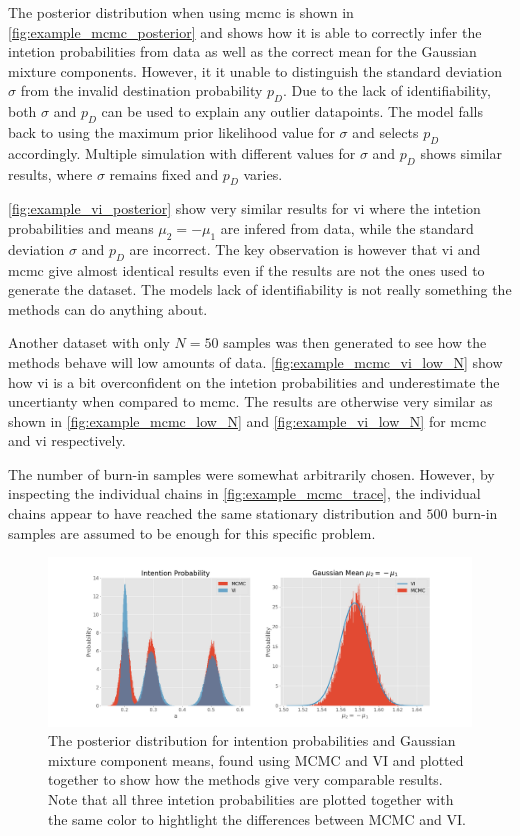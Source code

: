The posterior distribution when using \acrshort{mcmc} is shown in \cref{fig:example_mcmc_posterior} and shows how it is able to correctly infer the intetion probabilities from data as well as the correct mean for the Gaussian mixture components. However, it it unable to distinguish the standard deviation $\sigma$ from the invalid destination probability $p_D$. Due to the lack of identifiability, both $\sigma$ and $p_D$ can be used to explain any outlier datapoints. The model falls back to using the maximum prior likelihood value for $\sigma$ and selects $p_D$ accordingly. Multiple simulation with different values for $\sigma$ and $p_D$ shows similar results, where $\sigma$ remains fixed and $p_D$ varies.

\cref{fig:example_vi_posterior} show very similar results for \acrshort{vi} where the intetion probabilities and means $\mu_2 = -\mu_1$ are infered from data, while the standard deviation $\sigma$ and $p_D$ are incorrect. The key observation is however that \acrshort{vi} and \acrshort{mcmc} give almost identical results even if the results are not the ones used to generate the dataset. The models lack of identifiability is not really something the methods can do anything about.

Another dataset with only $N=50$ samples was then generated to see how the methods behave will low amounts of data. \cref{fig:example_mcmc_vi_low_N} show how \acrshort{vi} is a bit overconfident on the intetion probabilities and underestimate the uncertianty when compared to \acrshort{mcmc}. The results are otherwise very similar as shown in \cref{fig:example_mcmc_low_N} and \cref{fig:example_vi_low_N} for \acrshort{mcmc} and \acrshort{vi} respectively.

The number of burn-in samples were somewhat arbitrarily chosen. However, by inspecting the individual chains in \cref{fig:example_mcmc_trace}, the individual chains appear to have reached the same stationary distribution and $500$ burn-in samples are assumed to be enough for this specific problem. 

\begin{figure}[h]
    \centering
    \includegraphics[width=\textwidth]{figures/example_vi_mcmc_comparison.png}
    \caption{The posterior distribution for intention probabilities and Gaussian mixture component means, found using MCMC and VI and plotted together to show how the methods give very comparable results. Note that all three intetion probabilities are plotted together with the same color to hightlight the differences between MCMC and VI. }
    \label{fig:example_mcmc_vi_alphas}
\end{figure}

